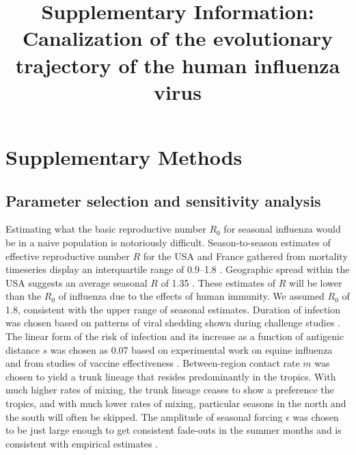 \setcounter{figure}{0}
\setcounter{table}{0}
\setcounter{page}{1}
\renewcommand{\thefigure}{Supplementary Fig.~\arabic{figure}}
\renewcommand{\thetable}{Supplementary Table~\arabic{table}}
\renewcommand{\thepage}{S\arabic{page}}
  
\title{\huge \bf Supplementary Information:\\ \vspace{0.5cm} \Large Canalization of the evolutionary trajectory of the human influenza virus}
\maketitle

\section*{Supplementary Methods}

\subsection*{Parameter selection and sensitivity analysis}

Estimating what the basic reproductive number $R_0$ for seasonal influenza would be in a naive population is notoriously difficult.  Season-to-season estimates of effective reproductive number $R$ for the USA and France gathered from mortality timeseries display an interquartile range of 0.9--1.8 .  Geographic spread within the USA suggests an average seasonal $R$ of 1.35 .  These estimates of $R$ will be lower than the $R_0$ of influenza due to the effects of human immunity.  We assumed $R_0$ of 1.8, consistent with the upper range of seasonal estimates.  Duration of infection was chosen based on patterns of viral shedding shown during challenge studies .  The linear form of the risk of infection and its increase as a function of antigenic distance $s$ was chosen as 0.07 based on experimental work on equine influenza  and from studies of vaccine effectiveness .  Between-region contact rate $m$ was chosen to yield a trunk lineage that resides predominantly in the tropics.  With much higher rates of mixing, the trunk lineage ceases to show a preference the tropics, and with much lower rates of mixing, particular seasons in the north and the south will often be skipped.  The amplitude of seasonal forcing $\epsilon$ was chosen to be just large enough to get consistent fade-outs in the summer months and is consistent with empirical estimates .

